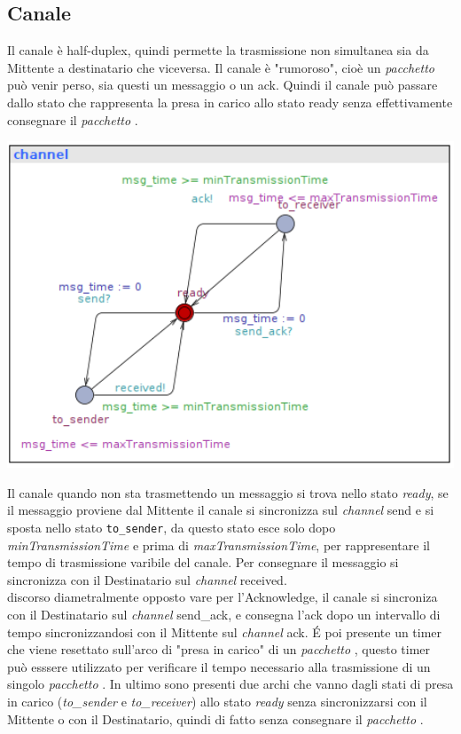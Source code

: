 \documentclass[a4paper]{article}
\newcommand{\channel}{\textit{channel }}
\newcommand{\pacchetto}{\textit{pacchetto }}
\begin{document}
\subsection{Canale}
Il canale è half-duplex, quindi permette la trasmissione non simultanea sia da Mittente a destinatario che viceversa.
Il canale è "rumoroso", cioè un \textit{\pacchetto}può venir perso, sia questi un messaggio o un ack. Quindi il canale può passare dallo stato che rappresenta la presa in carico allo stato ready senza effettivamente consegnare il \pacchetto.\\
\begin{center}\includegraphics[width=1\textwidth]{channel_unsafe.png}\end{center}
Il canale quando non sta trasmettendo un messaggio si trova nello stato \textit{ready}, se il messaggio proviene dal Mittente il canale si sincronizza sul \channel send e si sposta nello stato \texttt{to\_sender}, da questo stato esce solo dopo \textit{minTransmissionTime} e prima di \textit{maxTransmissionTime}, per rappresentare il tempo di trasmissione varibile del canale.
Per consegnare il messaggio si sincronizza con il Destinatario sul \channel received.\\
discorso diametralmente opposto vare per l'Acknowledge, il canale si sincroniza con il Destinatario sul \channel send\_ack, e consegna l'ack dopo un intervallo di tempo sincronizzandosi con il Mittente sul \channel ack.
É poi presente un timer che viene resettato sull'arco di "presa in carico" di un \pacchetto, questo timer può esssere utilizzato per verificare il tempo necessario alla trasmissione di un singolo \pacchetto.
In ultimo sono presenti due archi che vanno dagli stati di presa in carico (\textit{to\_sender} e \textit{to\_receiver}) allo stato \textit{ready} senza sincronizzarsi con il Mittente o con il Destinatario, quindi di fatto senza consegnare il \pacchetto.
\end{document}
